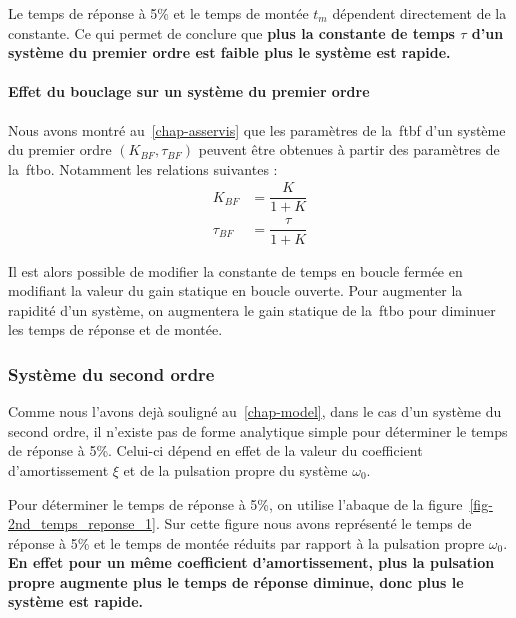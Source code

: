 Le temps de réponse à 5\% et le temps de montée $t_m$ dépendent 
directement de la constante. Ce qui permet de conclure que 
\textbf{plus la constante de temps $\tau$ d'un système du premier
ordre est faible plus le système est rapide.}

\paragraph{Effet du bouclage sur un système du premier ordre}
Nous avons montré au~\cref{chap-asservis} que les paramètres de 
la~\gls{ftbf} d'un système du premier ordre $(K_{BF},\tau_{BF})$ peuvent 
être obtenues à partir des paramètres de la~\gls{ftbo}. Notamment les relations
suivantes :
\begin{align*}
       K_{BF}&=\dfrac{K}{1+K}\\
    \tau_{BF}&=\dfrac{\tau}{1+K}
\end{align*}

Il est alors possible de modifier la constante de temps en boucle fermée en 
modifiant la valeur du gain statique en boucle ouverte. Pour augmenter
la rapidité d'un système, on augmentera le gain statique de la~\gls{ftbo} pour
diminuer les temps de réponse et de montée.

\subsubsection{Système du second ordre}
Comme nous l'avons dejà souligné au~\cref{chap-model}, dans le cas d'un système
du second ordre, il n'existe pas de forme analytique simple pour déterminer 
le temps de réponse à 5\%. Celui-ci dépend en effet de la valeur du coefficient 
d'amortissement $\xi$ et de la pulsation propre du système $\omega_0$.

Pour déterminer le temps de réponse à 5\%, on utilise l'abaque de la 
figure~\cref{fig-2nd_temps_reponse_1}. Sur cette figure nous avons représenté
le temps de réponse à 5\% et le temps de montée réduits par rapport à la
pulsation propre $\omega_0$. \textbf{En effet pour un même coefficient 
d'amortissement, plus la pulsation propre augmente plus le temps de réponse 
diminue, donc plus le système est rapide.}

